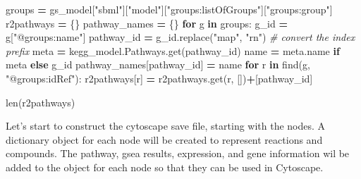 \documentclass[
]{book}
\newenvironment{Shaded}{\begin{snugshade}}{\end{snugshade}}
\newcommand{\BuiltInTok}[1]{#1}
\newcommand{\CommentTok}[1]{\textcolor[rgb]{0.56,0.35,0.01}{\textit{#1}}}
\newcommand{\ControlFlowTok}[1]{\textcolor[rgb]{0.13,0.29,0.53}{\textbf{#1}}}
\newcommand{\KeywordTok}[1]{\textcolor[rgb]{0.13,0.29,0.53}{\textbf{#1}}}
\newcommand{\NormalTok}[1]{#1}
\newcommand{\OperatorTok}[1]{\textcolor[rgb]{0.81,0.36,0.00}{\textbf{#1}}}
\newcommand{\StringTok}[1]{\textcolor[rgb]{0.31,0.60,0.02}{#1}}
\begin{document}
\begin{Shaded}
\begin{Highlighting}[numbers=left,,]
\NormalTok{groups }\OperatorTok{=}\NormalTok{ gs\_model[}\StringTok{"sbml"}\NormalTok{][}\StringTok{"model"}\NormalTok{][}\StringTok{"groups:listOfGroups"}\NormalTok{][}\StringTok{"groups:group"}\NormalTok{]}
\NormalTok{r2pathways }\OperatorTok{=}\NormalTok{ \{\}}
\NormalTok{pathway\_names }\OperatorTok{=}\NormalTok{ \{\}}
\ControlFlowTok{for}\NormalTok{ g }\KeywordTok{in}\NormalTok{ groups:}
\NormalTok{    g\_id }\OperatorTok{=}\NormalTok{ g[}\StringTok{"@groups:name"}\NormalTok{]}
\NormalTok{    pathway\_id }\OperatorTok{=}\NormalTok{ g\_id.replace(}\StringTok{"map"}\NormalTok{, }\StringTok{"rn"}\NormalTok{) }\CommentTok{\# convert the index prefix}
\NormalTok{    meta }\OperatorTok{=}\NormalTok{ kegg\_model.Pathways.get(pathway\_id)}
\NormalTok{    name }\OperatorTok{=}\NormalTok{ meta.name }\ControlFlowTok{if}\NormalTok{ meta }\ControlFlowTok{else}\NormalTok{ g\_id}
\NormalTok{    pathway\_names[pathway\_id] }\OperatorTok{=}\NormalTok{ name}
    \ControlFlowTok{for}\NormalTok{ r }\KeywordTok{in}\NormalTok{ find(g, }\StringTok{"@groups:idRef"}\NormalTok{):}
\NormalTok{        r2pathways[r] }\OperatorTok{=}\NormalTok{ r2pathways.get(r, [])}\OperatorTok{+}\NormalTok{[pathway\_id]}

\BuiltInTok{len}\NormalTok{(r2pathways)}
\end{Highlighting}
\end{Shaded}

Let's start to construct the cytoscape save file, starting with the nodes. A dictionary object for each node
will be created to represent reactions and compounds. The pathway, gsea results, expression, and gene information
wil be added to the object for each node so that they can be used in Cytoscape.
\end{document}
